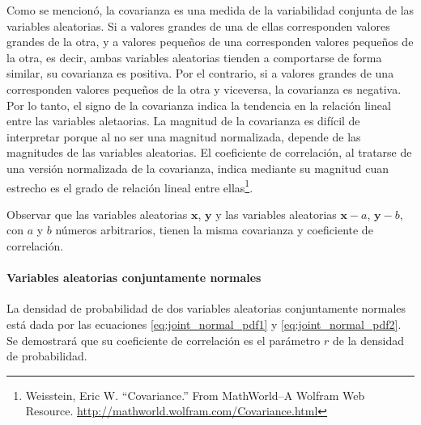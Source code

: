 \documentclass[a4paper]{report}
\newcommand{\x}{\mathbf{x}}
\newcommand{\y}{\mathbf{y}}
\begin{document}
Como se mencionó, la covarianza es una medida de la variabilidad conjunta de las variables aleatorias. Si a valores grandes de una de ellas corresponden valores grandes de la otra, y a valores pequeños de una corresponden valores pequeños de la otra, es decir, ambas variables aleatorias tienden a comportarse de forma similar, su covarianza es positiva. Por el contrario, si a valores grandes de una corresponden valores pequeños de la otra y viceversa, la covarianza es negativa. Por lo tanto, el signo de la covarianza indica la tendencia en la relación lineal entre las variables aletaorias. La magnitud de la covarianza es difícil de interpretar porque al no ser una magnitud normalizada, depende de las magnitudes de las variables aleatorias. El coeficiente de correlación, al tratarse de una versión normalizada de la covarianza, indica mediante su magnitud cuan estrecho es el grado de relación lineal entre ellas\footnote{Weisstein, Eric W. ``Covariance.'' From MathWorld--A Wolfram Web Resource. \url{http://mathworld.wolfram.com/Covariance.html}}.

Observar que las variables aleatorias \(\x\), \(\y\) y las variables aleatorias \(\x-a\), \(\y-b\), con \(a\) y \(b\) números arbitrarios, tienen la misma covarianza y coeficiente de correlación.

\paragraph{Variables aleatorias conjuntamente normales}

La densidad de probabilidad de dos variables aleatorias conjuntamente normales está dada por las ecuaciones \ref{eq:joint_normal_pdf1} y \ref{eq:joint_normal_pdf2}. Se demostrará que su coeficiente de correlación es el parámetro \(r\) de la densidad de probabilidad.
\end{document}
